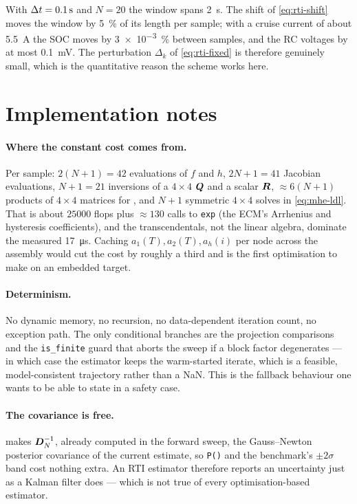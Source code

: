 With $\Delta t = \SI{0.1}{\second}$ and $N = 20$ the window spans \SI{2}{\second}.  The shift of
\cref{eq:rti-shift} moves the window by \SI{5}{\percent} of its length per sample; with a cruise
current of about \SI{5.5}{\ampere} the SOC moves by \SI{3e-3}{\percent} between samples, and the RC
voltages by at most \SI{0.1}{\milli\volt}.  The perturbation $\Delta_k$ of \cref{eq:rti-fixed} is
therefore genuinely small, which is the quantitative reason the scheme works here.

\section{Implementation notes}
\paragraph{Where the constant cost comes from.}  Per sample: $2(N{+}1) = 42$ evaluations of $f$ and
$h$, $2N{+}1 = 41$ Jacobian evaluations, $N{+}1 = 21$ inversions of a $4\times4$ $\bm{Q}$ and a scalar
$\bm{R}$, $\approx 6(N{+}1)$ products of $4\times4$ matrices for , and
$N{+}1$ symmetric $4\times4$ solves in \cref{eq:mhe-ldl}.  That is about $\num{25000}$ flops plus
$\approx 130$ calls to \texttt{exp} (the ECM's Arrhenius and hysteresis coefficients), and the
transcendentals, not the linear algebra, dominate the measured \SI{17}{\micro\second}.  Caching
$a_1(T), a_2(T), a_h(i)$ per node across the assembly would cut the cost by roughly a third and is
the first optimisation to make on an embedded target.

\paragraph{Determinism.}  No dynamic memory, no recursion, no data-dependent iteration count, no
exception path.  The only conditional branches are the projection comparisons and the
\texttt{is\_finite} guard that aborts the sweep if a block factor degenerates --- in which case the
estimator keeps the warm-started iterate, which is a feasible, model-consistent trajectory rather
than a NaN.  This is the fallback behaviour one wants to be able to state in a safety case.

\paragraph{The covariance is free.}   makes $\bm{D}_N^{-1}$, already computed in
the forward sweep, the Gauss--Newton posterior covariance of the current estimate, so \texttt{P()}
and the benchmark's $\pm2\sigma$ band cost nothing extra.  An RTI estimator therefore reports an
uncertainty just as a Kalman filter does --- which is not true of every optimisation-based
estimator.

